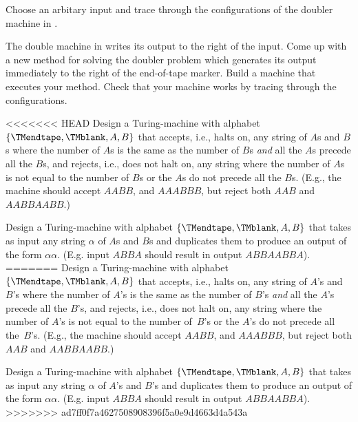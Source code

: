 \documentclass[../../../include/open-logic-section]{subfiles}
\begin{document}
\begin{prob}
Choose an arbitary input and trace through the configurations of the
doubler machine in .
\end{prob}

\begin{prob}
The double machine in  writes its
output to the right of the input.  Come up with a new method for
solving the doubler problem which generates its output immediately to
the right of the end-of-tape marker. Build a machine that executes
your method. Check that your machine works by tracing through the
configurations.
\end{prob}

\begin{prob}
<<<<<<< HEAD
Design a Turing-machine with alphabet $\{\TMendtape,\TMblank, A, B\}$ that
accepts, i.e., halts on, any string of $A$s and $B$s where the number of $A$s is the
same as the number of $B$s \emph{and} all the $A$s precede all the
$B$s, and rejects, i.e., does not halt on, any string where the number of $A$s is not equal to
the number of $B$s or the $A$s do not precede all the $B$s. (E.g., the
machine should accept $AABB$, and $AAABBB$, but reject both $AAB$ and
$AABBAABB$.)
\end{prob}

\begin{prob}
Design a Turing-machine with alphabet $\{\TMendtape,\TMblank, A, B\}$ that takes
as input any string $\alpha$ of $A$s and $B$s and duplicates them to
produce an output of the form $\alpha\alpha$. (E.g. input $ABBA$
should result in output $ABBAABBA$).
=======
Design a Turing-machine with alphabet $\{\TMendtape,\TMblank, A, B\}$
that accepts, i.e., halts on, any string of $A$'s and $B$'s where the
number of $A$'s is the same as the number of $B$'s \emph{and} all the
$A$'s precede all the $B$'s, and rejects, i.e., does not halt on, any
string where the number of $A$'s is not equal to the number of~$B$'s or
the $A$'s do not precede all the~$B$'s. (E.g., the machine should accept
$AABB$, and $AAABBB$, but reject both $AAB$ and $AABBAABB$.)
\end{prob}

\begin{prob}
Design a Turing-machine with alphabet $\{\TMendtape,\TMblank, A, B\}$
that takes as input any string $\alpha$ of $A$'s and $B$'s and
duplicates them to produce an output of the form $\alpha\alpha$. (E.g.
input $ABBA$ should result in output $ABBAABBA$).
>>>>>>> ad7ff0f7a4627508908396f5a0e9d4663d4a543a
\end{prob}
\end{document}
